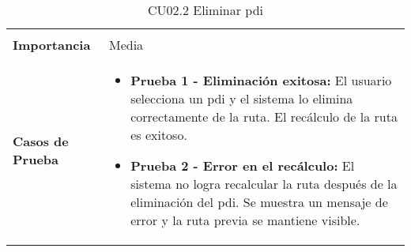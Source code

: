 \begin{table}[H]
\begin{tabularx}{\linewidth}{ p{} p{} }
\begin{itemize}
		\end{itemize}\\
		\textbf{Importancia}          & Media \\
		\textbf{Casos de Prueba}      &
		\begin{itemize}
			\item \textbf{Prueba 1 - Eliminación exitosa:} El usuario selecciona un \acrshort{pdi} y el sistema lo elimina correctamente de la ruta. El recálculo de la ruta es exitoso.
			\vspace{2pt}
			\item \textbf{Prueba 2 - Error en el recálculo:} El sistema no logra recalcular la ruta después de la eliminación del \acrshort{pdi}. Se muestra un mensaje de error y la ruta previa se mantiene visible.
			\vspace{2pt}
		\end{itemize} \\
		\bottomrule
	\end{tabularx}
	\caption{CU02.2 Eliminar \acrlong{pdi}}
	\label{cu:eliminar-pdi}
\end{table}


